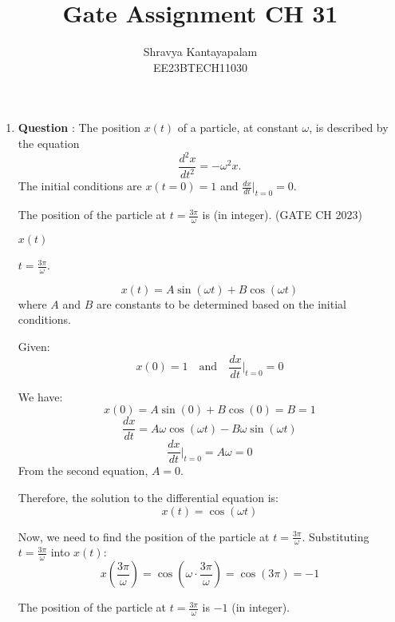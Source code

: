 \documentclass[journal,12pt,twocolumn]{IEEEtran}
\theoremstyle{remark}
\begin{document}
\title{Gate Assignment CH 31}
\author{Shravya Kantayapalam\\ EE23BTECH11030}
\maketitle

\begin{enumerate}
    \item \textbf{Question }:
The position \( x(t) \) of a particle, at constant \( \omega \), is described by the equation
\[
\frac{{d^2x}}{{dt^2}} = -\omega^2 x.
\]
The initial conditions are \( x(t=0) = 1 \) and \( \frac{{dx}}{{dt}}\bigg|_{t=0} = 0 \). 

The position of the particle at \( t = \frac{{3\pi}}{{\omega}} \) is \underline{\hspace{2cm}} (in integer).
\hfill{(GATE CH 2023)}
\solution

 \( x(t) \) 
 
  \( t = \frac{3\pi}{\omega} \).

\[ x(t) = A \sin(\omega t) + B \cos(\omega t) \]
where \( A \) and \( B \) are constants to be determined based on the initial conditions.

Given:
\[ x(0) = 1 \quad \text{and} \quad \frac{dx}{dt}\Bigg|_{t=0} = 0 \]

We have:
\[ x(0) = A \sin(0) + B \cos(0) = B = 1 \]
\[ \frac{dx}{dt} = A\omega\cos(\omega t) - B\omega\sin(\omega t) \]
\[ \frac{dx}{dt}\Bigg|_{t=0} = A\omega = 0 \]
From the second equation, \( A = 0 \).

Therefore, the solution to the differential equation is:
\[ x(t) = \cos(\omega t) \]

Now, we need to find the position of the particle at \( t = \frac{3\pi}{\omega} \). Substituting \( t = \frac{3\pi}{\omega} \) into \( x(t) \):
\[ x\left(\frac{3\pi}{\omega}\right) = \cos\left(\omega \cdot \frac{3\pi}{\omega}\right) = \cos(3\pi) = -1 \]

The position of the particle at \( t = \frac{3\pi}{\omega} \) is \(-1\) (in integer).


\end{enumerate}
\end{document}
